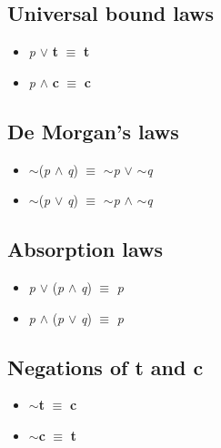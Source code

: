 \documentclass{article}
\begin{document}
\subsection{Universal bound laws}
\begin{itemize}
\item \textit{p} $\lor$ \textbf{t} $\equiv$ \textbf{t}
\item \textit{p} $\wedge$ \textbf{c} $\equiv$ \textbf{c}
\end{itemize}

\subsection{De Morgan's laws}
\begin{itemize}
\item $\sim$(\textit{p} $\wedge$ \textit{q}) $\equiv$ $\sim$\textit{p} $\lor$ $\sim$\textit{q}
\item $\sim$(\textit{p} $\lor$ \textit{q}) $\equiv$ $\sim$\textit{p} $\wedge$ $\sim$\textit{q}
\end{itemize}

\subsection{Absorption laws}
\begin{itemize}
\item \textit{p} $\lor$ (\textit{p} $\wedge$ \textit{q}) $\equiv$ \textit{p}
\item \textit{p} $\wedge$ (\textit{p} $\lor$ \textit{q}) $\equiv$ \textit{p}
\end{itemize}

\subsection{Negations of t and c}
\begin{itemize}
\item $\sim$\textbf{t} $\equiv$ \textbf{c}
\item $\sim$\textbf{c} $\equiv$ \textbf{t}
\end{itemize}
\end{document}
